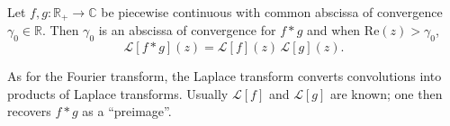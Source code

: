 \begin{theorem}
Let $f, g : \mathbb{R}_+ \to \mathbb{C}$ be piecewise continuous with common abscissa of convergence $\gamma_0 \in \mathbb{R}$. Then $\gamma_0$ is an abscissa of convergence for $f * g$ and when $\mathrm{Re}(z) > \gamma_0$,
\[
\boxed{\mathcal{L}[f * g](z) = \mathcal{L}[f](z)\,\mathcal{L}[g](z).}
\]
\end{theorem}

\begin{remark}
As for the Fourier transform, the Laplace transform converts convolutions into products of Laplace transforms. Usually $\mathcal{L}[f]$ and $\mathcal{L}[g]$ are known; one then recovers $f * g$ as a ``preimage''.
\end{remark}
